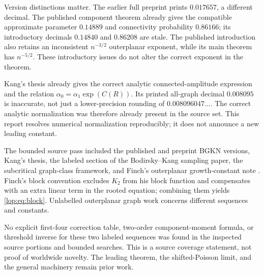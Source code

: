 \documentclass[11pt,letterpaper]{article}
\numberwithin{equation}{section}
\theoremstyle{remark}\newtheorem{remark}[theorem]{Remark}
\begin{document}
Version distinctions matter. The earlier full preprint
\cite{bgknpreprint} prints $0.017657$, a different decimal.
The published component theorem already gives the compatible approximate
parameter $0.14889$ and connectivity probability $0.86166$; its
introductory decimals $0.14840$ and $0.86208$ are stale. The published
introduction also retains an inconsistent $n^{-3/2}$ outerplanar
exponent, while its main theorem has $n^{-5/2}$. These introductory
issues do not alter the correct exponent in the theorem.

Kang's thesis \cite[p.~55]{kang} already gives the correct analytic
connected-amplitude expression and the relation
$\alpha_0=\alpha_1\exp(C(R))$. Its printed all-graph decimal
$0.008095$ is inaccurate, not just a lower-precision rounding of
$0.008096047\ldots$. The correct analytic normalization was therefore
already present in the source set. This report resolves numerical
normalization reproducibly; it does not announce a new leading constant.

The bounded source pass included the published and preprint BGKN
versions, Kang's thesis, the labeled section of the Bodirsky--Kang
sampling paper, the subcritical graph-class framework, and Finch's
outerplanar growth-constant note \cite{finch}. Finch's block convention
excludes $K_2$ from his block function and compensates with an extra
linear term in the rooted equation; combining them yields
\eqref{lop:eq:block}. Unlabelled outerplanar graph work \cite{unlabelled}
concerns different sequences and constants.

No explicit first-four correction table, two-order component-moment
formula, or threshold inverse for these two labeled sequences was found
in the inspected source portions and bounded searches. This is a source
coverage statement, not proof of worldwide novelty. The leading theorem,
the shifted-Poisson limit, and the general machinery remain prior work.
\end{document}
